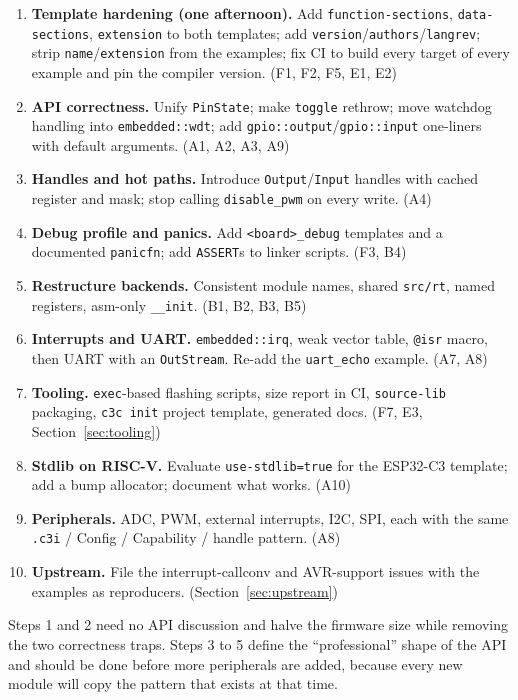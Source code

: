 \documentclass[11pt,a4paper]{article}
\newcommand{\pkg}[1]{\texttt{#1}}
\begin{document}
\begin{enumerate}[label=\textbf{Step \arabic*.},leftmargin=*,itemsep=4pt]
  \item \textbf{Template hardening (one afternoon).} Add \pkg{function-sections},
        \pkg{data-sections}, \pkg{extension} to both templates; add \pkg{version}/\pkg{authors}/\pkg{langrev};
        strip \pkg{name}/\pkg{extension} from the examples; fix CI to build every target of every example
        and pin the compiler version. (F1, F2, F5, E1, E2)
  \item \textbf{API correctness.} Unify \pkg{PinState}; make \pkg{toggle} rethrow; move watchdog
        handling into \pkg{embedded::wdt}; add \pkg{gpio::output}/\pkg{gpio::input} one-liners with
        default arguments. (A1, A2, A3, A9)
  \item \textbf{Handles and hot paths.} Introduce \pkg{Output}/\pkg{Input} handles with cached
        register and mask; stop calling \pkg{disable\_pwm} on every write. (A4)
  \item \textbf{Debug profile and panics.} Add \pkg{<board>\_debug} templates and a documented
        \pkg{panicfn}; add \pkg{ASSERT}s to linker scripts. (F3, B4)
  \item \textbf{Restructure backends.} Consistent module names, shared \pkg{src/rt}, named
        registers, asm-only \pkg{\_\_init}. (B1, B2, B3, B5)
  \item \textbf{Interrupts and UART.} \pkg{embedded::irq}, weak vector table, \pkg{@isr} macro,
        then UART with an \pkg{OutStream}. Re-add the \pkg{uart\_echo} example. (A7, A8)
  \item \textbf{Tooling.} \pkg{exec}-based flashing scripts, size report in CI, \pkg{source-lib}
        packaging, \pkg{c3c init} project template, generated docs. (F7, E3, Section~\ref{sec:tooling})
  \item \textbf{Stdlib on RISC-V.} Evaluate \pkg{use-stdlib=true} for the ESP32-C3 template; add
        a bump allocator; document what works. (A10)
  \item \textbf{Peripherals.} ADC, PWM, external interrupts, I2C, SPI, each with the same
        \pkg{.c3i} / Config / Capability / handle pattern. (A8)
  \item \textbf{Upstream.} File the interrupt-callconv and AVR-support issues with the
        examples as reproducers. (Section~\ref{sec:upstream})
\end{enumerate}

\vspace{1em}
\noindent
Steps 1 and 2 need no API discussion and halve the firmware size while removing the two
correctness traps. Steps 3 to 5 define the ``professional'' shape of the API and should be
done before more peripherals are added, because every new module will copy the pattern that
exists at that time.
\end{document}
